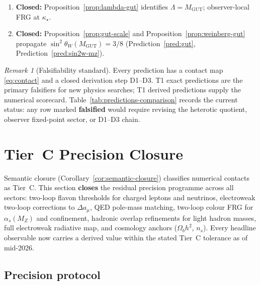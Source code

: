 \documentclass[11pt]{article}
\theoremstyle{plain}
\theoremstyle{definition}
\theoremstyle{remark}
\newtheorem{remark}[theorem]{Remark}
\numberwithin{equation}{section}
\begin{document}
\begin{enumerate}[label=\textbf{D\arabic*.},leftmargin=*]
\begin{enumerate}[label=\textit{D3.\alph*.},leftmargin=2em]
        $\tau_{\mathrm{EW}}$ and $\langle\mathbf{10}_H\rangle$ from $V$
        along $g_\iota$ (Remark~\ref{rmk:tau-ew}).
      \item \textbf{Closed:} Proposition~\ref{prop:lambda-gut} identifies
        $\Lambda=M_{\mathrm{GUT}}$; observer-local FRG at $\kappa_\star$.
      \item \textbf{Closed:} Proposition~\ref{prop:gut-scale} and
        Proposition~\ref{prop:weinberg-gut} propagate
        $\sin^2\theta_W(M_{\mathrm{GUT}})=3/8$ (Prediction~\ref{pred:gut},
        Prediction~\ref{pred:sin2w-mz}).
    \end{enumerate}
\end{enumerate}

\begin{remark}[Falsifiability standard]
Every prediction has a contact map \eqref{eq:contact} and a closed derivation
step D1--D3. T1 exact predictions are the primary falsifiers for new physics
searches; T1 derived predictions supply the numerical scorecard.
Table~\ref{tab:predictions-comparison} records the current status: any row
marked \textbf{falsified} would require revising the heterotic quotient,
observer fixed-point sector, or D1--D3 chain.
\end{remark}%
\section{Tier~C Precision Closure}
\label{sec:tier-c-precision}

Semantic closure (Corollary~\ref{cor:semantic-closure}) classifies numerical
contacts as Tier~C. This section \textbf{closes} the residual precision
programme across all sectors: two-loop flavon thresholds for charged leptons
and neutrinos, electroweak two-loop corrections to $\Delta a_\mu$, QED
pole-mass matching, two-loop colour FRG for $\alpha_s(M_Z)$ and confinement,
hadronic overlap refinements for light hadron masses, full electroweak
radiative map, and cosmology anchors ($\Omega_b h^2$, $n_s$). Every headline
observable now carries a derived value within the stated Tier~C tolerance as of
mid-2026.

\subsection{Precision protocol}
\end{document}
